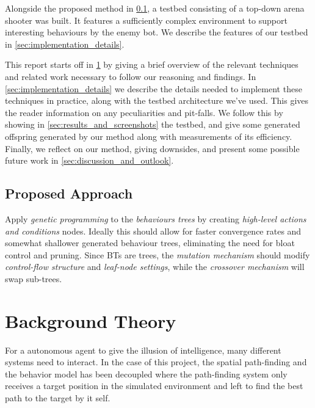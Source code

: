 \documentclass[a4paper, twocolumn]{article}
\begin{document}
    Alongside the proposed method in \cref{sec:proposed_approach}, a testbed consisting of a top-down arena shooter was built. It features a sufficiently complex environment to support interesting behaviours by the enemy bot. We describe the features of our testbed in \cref{sec:implementation_details}.

    This report starts off in \cref{sec:background_theory} by giving a brief overview of the relevant techniques and related work necessary to follow our reasoning and findings. In \cref{sec:implementation_details} we describe the details needed to implement these techniques in practice, along with the testbed architecture we've used. This gives the reader information on any peculiarities and pit-falls. We follow this by showing in \cref{sec:results_and_screenshots} the testbed, and give some generated offspring generated by our method along with measurements of its efficiency. Finally, we reflect on our method, giving downsides, and present some possible future work in \cref{sec:discussion_and_outlook}.

    \vspace{-0.8em}

    \subsection{Proposed Approach} \label{sec:proposed_approach}

    Apply \emph{genetic programming} to the \emph{behaviours trees} by creating \emph{high-level actions and conditions} nodes. Ideally this should allow for faster convergence rates and somewhat shallower generated behaviour trees, eliminating the need for bloat control and pruning. Since BTs are trees, the \emph{mutation mechanism} should modify \emph{control-flow structure} and \emph{leaf-node settings}, while the \emph{crossover mechanism} will swap sub-trees.

    \section{Background Theory} \label{sec:background_theory}

    For a autonomous agent to give the illusion of intelligence, many different systems need to interact. In the case of this project, the spatial path-finding and the behavior model has been decoupled where the path-finding system only receives a target position in the simulated environment and left to find the best path to the target by it self.
\end{document}
